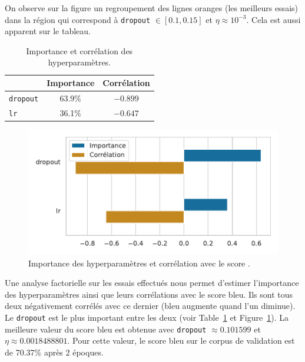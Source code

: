On observe sur la figure un regroupement des lignes oranges (les meilleurs essais) 
dans la région qui correspond à \verb|dropout| \(\in[0.1, 0.15]\) et \(\eta\approx 10 ^{-3}\).
Cela est aussi apparent sur le tableau.
\begin{table}[hbt]
    \begin{center}
        \begin{tabular}{|l|c|c|}
            \cline{2-3}
            \multicolumn{1}{c|}{} & Importance & Corrélation \\
            \hline
            \verb|dropout|        & 63.9\%     & \(- 0.899\)     \\
            \hline
            \verb|lr|             & 36.1\%     & \(- 0.647\)     \\
            \hline
        \end{tabular}
    \end{center}
    \caption{Importance et corrélation des hyperparamètres.}
    \label{tab.results.hparam.corr}
\end{table}
\begin{figure}[hbt]
    \begin{center}
        \includegraphics[width=.7\textwidth]{assets/python/importance.pdf}
    \end{center}
    \caption{Importance des hyperparamètres et corrélation avec le score .}%
    \label{fig.results.hparam.corr}
\end{figure}
Une analyse factorielle sur les essais effectués nous permet d'estimer l'importance des hyperparamètres 
ainsi que leurs corrélations avec le score \gls{bleu}.
Ils sont tous deux négativement corrélés avec ce dernier (\gls{bleu} augmente quand l'un diminue).
Le \verb|dropout| est le plus important entre les deux 
(voir Table~\ref{tab.results.hparam.corr} et Figure~\ref{fig.results.hparam.corr}).
La meilleure valeur du score \gls{bleu} est obtenue 
avec \verb|dropout| \(\approx 0.101599\) et \(\eta\approx 0.0018488801\).
Pour cette valeur, le score \gls{bleu} sur le corpus de validation est de 70.37\% après 2 époques.